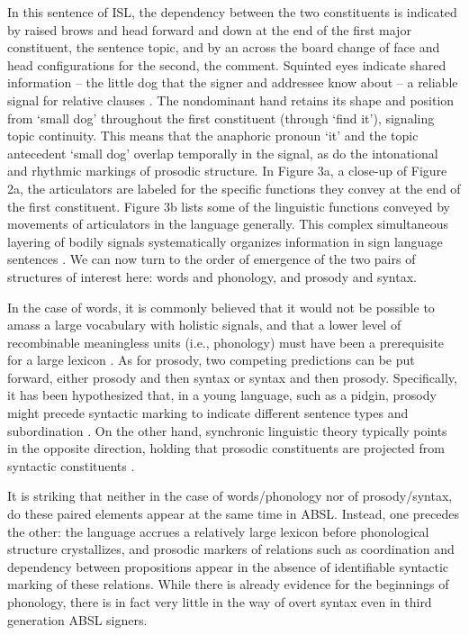 \documentclass[output=paper]{langsci/langscibook}
\begin{document}
  In this sentence of ISL, the dependency between the two constituents is indicated by raised brows and head forward and down at the end of the first major constituent, the sentence topic, and by an across the board change of face and head configurations for the second, the comment.  Squinted eyes indicate shared information – the little dog that the signer and addressee know about – a reliable signal for relative clauses \citep{Nespor1998,Dachkovsky2009}. The nondominant hand retains its shape and position from ‘small dog’ throughout the first constituent (through ‘find it’), signaling topic continuity.  This means that the anaphoric pronoun ‘it’ and the topic antecedent ‘small dog’ overlap temporally in the signal, as do the intonational and rhythmic markings of prosodic structure. In Figure 3a, a close-up of Figure 2a, the articulators are labeled for the specific functions they convey at the end of the first constituent.  Figure 3b lists some of the linguistic functions conveyed by movements of articulators in the language generally. This complex simultaneous layering of bodily signals systematically organizes information in sign language sentences \citep{Wilbur2000}.  We can now turn to the order of emergence of the two pairs of structures of interest here: words and phonology, and prosody and syntax.  

 In the case of words, it is commonly believed that it would not be possible to amass a large vocabulary with holistic signals, and that a lower level of recombinable meaningless units (i.e., phonology) must have been a prerequisite for a large lexicon \citep{Hockett1960,Pinker2005}.  As for prosody, two competing predictions can be put forward, either prosody and then syntax or syntax and then prosody.  Specifically, it has been hypothesized that, in a young language, such as a pidgin, prosody might precede syntactic marking to indicate different sentence types and subordination \citep{Givón1979}.  On the other hand, synchronic linguistic theory typically points in the opposite direction, holding that prosodic constituents are projected from syntactic constituents \citep{Selkirk1984,Nespor1986}. 

\newpage 
It is striking that neither in the case of words/phonology nor of prosody/syn\-tax, do these paired elements appear at the same time in ABSL.  Instead, one precedes the other:  the language accrues a relatively large lexicon before phonological structure crystallizes, and prosodic markers of relations such as coordination and dependency between propositions appear in the absence of identifiable syntactic marking of these relations.  While there is already evidence for the beginnings of phonology, there is in fact very little in the way of overt syntax even in third generation ABSL signers.   
\end{document}
